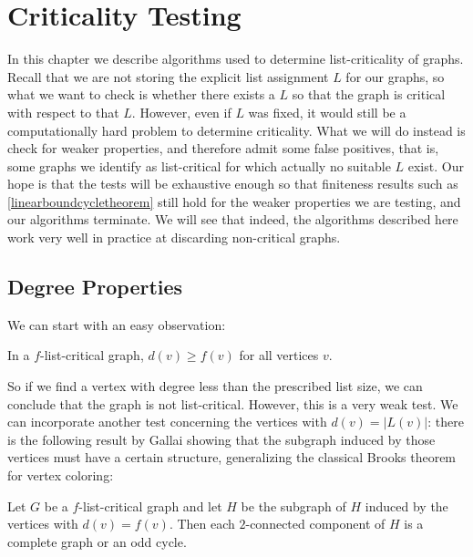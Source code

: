 \chapter{Criticality Testing}

In this chapter we describe algorithms used to determine list-criticality of graphs. Recall that we are 
not storing the explicit list assignment $L$ for our graphs, so what we want to check is whether there 
exists a $L$ so that the graph is critical with respect to that $L$. However, even if $L$ was fixed, 
it would still be a computationally hard problem to determine criticality. What we will do instead is check 
for weaker properties, and therefore admit some false positives, that is, some graphs we identify as list-critical 
for which actually no suitable $L$ exist. Our hope is that the tests will be exhaustive enough so that finiteness 
results such as \ref{linearboundcycletheorem} still hold for the weaker properties we are testing, and our algorithms 
terminate. We will see that indeed, the algorithms described here work very well in practice at discarding non-critical graphs. 


\section{Degree Properties}

We can start with an easy observation:

\begin{observation}
\label{degreeobs}
In a $f$-list-critical graph, $d(v) \geq f(v)$ for all vertices $v$.
\end{observation}

So if we find a vertex with degree less than the prescribed list size, we can conclude that the graph is not list-critical. 
However, this is a very weak test. We can incorporate another test concerning the vertices with $d(v) = |L(v)|$: there is
the following result by Gallai showing that the subgraph induced by those vertices must have a certain structure, generalizing 
the classical Brooks theorem for vertex coloring:

\begin{theorem}
Let $G$ be a $f$-list-critical graph and let $H$ be the subgraph
of $H$ induced by the vertices with $d(v) = f(v)$. 
Then each $2$-connected component of $H$ is a complete graph or an odd cycle.
\end{theorem}


